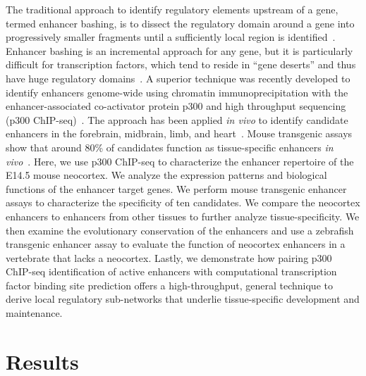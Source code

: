 The traditional approach to identify regulatory elements upstream of a gene, termed enhancer bashing, is to dissect the
regulatory domain around a gene into progressively smaller fragments until a sufficiently local region is identified~\citep{Luo2008}.
Enhancer bashing is an incremental approach for any gene, but it is particularly difficult for transcription factors, which
tend to reside in ``gene deserts'' and thus have huge regulatory domains~\citep{McLean2010, Ovcharenko2005}.  A superior technique
was recently developed to identify enhancers genome-wide using chromatin immunoprecipitation with the enhancer-associated
co-activator protein p300 and high throughput sequencing (p300 ChIP-seq)~\citep{Visel2009}.  The approach has been applied
\textit{in vivo} to identify candidate enhancers in the forebrain, midbrain, limb, and heart~\citep{Blow2010, May2012, Visel2009}.
Mouse transgenic assays show that around 80\% of candidates function as tissue-specific enhancers \textit{in vivo}~\citep{Visel2009}.
Here, we use p300 ChIP-seq to characterize the enhancer repertoire of the E14.5 mouse neocortex.  We analyze the expression patterns
and biological functions of the enhancer target genes.  We perform mouse transgenic enhancer assays to characterize the specificity
of ten candidates.  We compare the neocortex enhancers to enhancers from other tissues to further analyze tissue-specificity.  We then
examine the evolutionary conservation of the enhancers and use a zebrafish transgenic enhancer assay to evaluate the function of
neocortex enhancers in a vertebrate that lacks a neocortex.  Lastly, we demonstrate how pairing p300 ChIP-seq identification of
active enhancers with computational transcription factor binding site prediction offers a high-throughput, general technique to
derive local regulatory sub-networks that underlie tissue-specific development and maintenance.

\section{Results}


